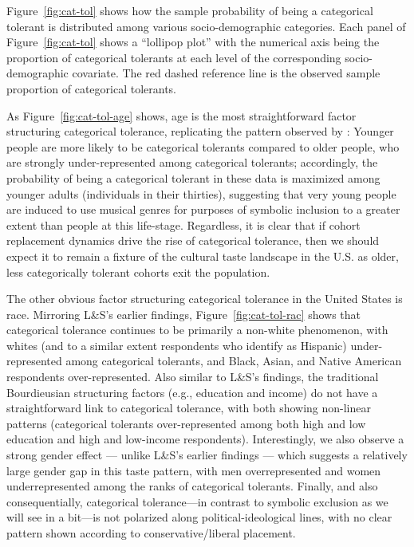 \documentclass[12pt]{article}
\begin{document}
Figure~\ref{fig:cat-tol} shows how the sample probability of being a categorical tolerant is distributed among various socio-demographic categories. Each panel of Figure~\ref{fig:cat-tol} shows a ``lollipop plot'' with the numerical axis being the proportion of categorical tolerants at each level of the corresponding socio-demographic covariate. The red dashed reference line is the observed sample proportion of categorical tolerants. 

As Figure~\ref{fig:cat-tol-age} shows, age is the most straightforward factor structuring categorical tolerance, replicating the pattern observed by \citet{lizardo2016end-4fb}: Younger people are more likely to be categorical tolerants compared to older people, who are strongly under-represented among categorical tolerants; accordingly, the probability of being a categorical tolerant in these data is maximized among younger adults (individuals in their thirties), suggesting that very young people are induced to use musical genres for purposes of symbolic inclusion to a greater extent than people at this life-stage. Regardless, it is clear that if cohort replacement dynamics drive the rise of categorical tolerance, then we should expect it to remain a fixture of the cultural taste landscape in the U.S. as older, less categorically tolerant cohorts exit the population. 

The other obvious factor structuring categorical tolerance in the United States is race. Mirroring L\&S's earlier findings, Figure~\ref{fig:cat-tol-rac} shows that categorical tolerance continues to be primarily a non-white phenomenon, with whites (and to a similar extent respondents who identify as Hispanic) under-represented among categorical tolerants, and Black, Asian, and Native American respondents over-represented. Also similar to L\&S's findings, the traditional Bourdieusian structuring factors (e.g., education and income) do not have a straightforward link to categorical tolerance, with both showing non-linear patterns (categorical tolerants over-represented among both high and low education and high and low-income respondents). Interestingly, we also observe a strong gender effect — unlike L\&S's earlier findings — which suggests a relatively large gender gap in this taste pattern, with men overrepresented and women underrepresented among the ranks of categorical tolerants. Finally, and also consequentially, categorical tolerance---in contrast to symbolic exclusion as we will see in a bit---is not polarized along political-ideological lines, with no clear pattern shown according to conservative/liberal placement. 
\end{document}
